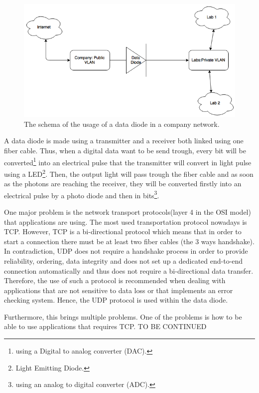 \documentclass[a4paper,10pt]{article}
\begin{document}
\begin{figure}
\centering
\includegraphics[scale=0.45]{images/dataDiode.png}
\caption{The schema of the usage of a data diode in a company network.}
\label{fig:datadiode}
\end{figure}

A data diode is made using a transmitter and a receiver both linked using one fiber cable. Thus, when a digital data want to be send trough, every bit will be converted\footnote{using a Digital to analog converter (DAC).} into an electrical pulse that the transmitter will convert in light pulse using a LED\footnote{Light Emitting Diode.}. Then, the output light will pass trough the fiber cable and as soon as the photons are reaching the receiver, they will be converted firstly into an electrical pulse by a photo diode and then in bits\footnote{using an analog to digital converter (ADC).}.

One major problem is the network transport protocols(layer 4 in the OSI model) that applications are using. The most used transportation protocol nowadays is TCP. However, TCP is a bi-directional protocol which means that in order to start a connection there must be at least two fiber cables (the 3 ways handshake). In contradiction, UDP does not require a handshake process in order to provide reliability, ordering, data integrity and does not set up a dedicated end-to-end connection automatically and thus does not require a bi-directional data transfer. Therefore, the use of such a protocol is recommended when dealing with applications that are not sensitive to data loss or that implements an error checking system. Hence, the UDP protocol is used within the data diode.

Furthermore, this brings multiple problems. One of the problems is how to be able to use applications that requires TCP.  TO BE CONTINUED
\end{document}
